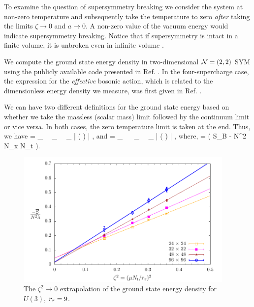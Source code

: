 To examine the question of supersymmetry breaking we consider the system at non-zero temperature and subsequently take the temperature to zero {\it after} taking the limits $\zeta \to 0$ and $a \to 0$. A non-zero value of the vacuum energy would indicate supersymmetry breaking. Notice that if supersymmetry is intact in a finite volume, it is unbroken even in infinite volume \cite{Witten:1982df}.

We compute the ground state energy density in two-dimensional $\mathcal N = (2, 2)$ SYM using the publicly available code presented in Ref. \cite{Schaich:2014pda}. In the four-supercharge case, the expression for the \emph{effective} bosonic action, which is related to the dimensionless energy density we measure, was first given in Ref. \cite{Catterall:2008dv}. 

We can have two different definitions for the ground state energy based on whether we take the massless (scalar mass) limit followed by the continuum limit or vice versa. In both cases, the zero temperature limit is taken at the end. Thus, we have 
\beq
\label{eq:energy1} 
 = \lim_{\beta\to\infty} ~~\lim_{ } ~~\lim_{\mu {}} \Bigg \langle {} \Bigg | \left(  \right) \Bigg |   \Bigg \rangle,
\eeq
and 
\beq
\label{eq:energy2} 
 = \lim_{\beta\to\infty} ~~ \lim_{\mu {}} ~~\lim_{ } \Bigg \langle {} \Bigg | \left(  \right) \Bigg |   \Bigg \rangle,
\eeq
where, 
\beq
\SB =  \left( S_B -  N^2 N_x N_t \right).
\eeq 
\begin{figure}[htb]
\begin{center} 
\includegraphics[width=0.95\textwidth]{Figures/mass_U3_rt9.pdf}
\end{center}
\caption{\label{fig:mass_U3}The $\zeta^2 \to 0$ extrapolation of the ground state energy density for $U(3)$, ${r_{\tau}} = 9$.}
\end{figure}
